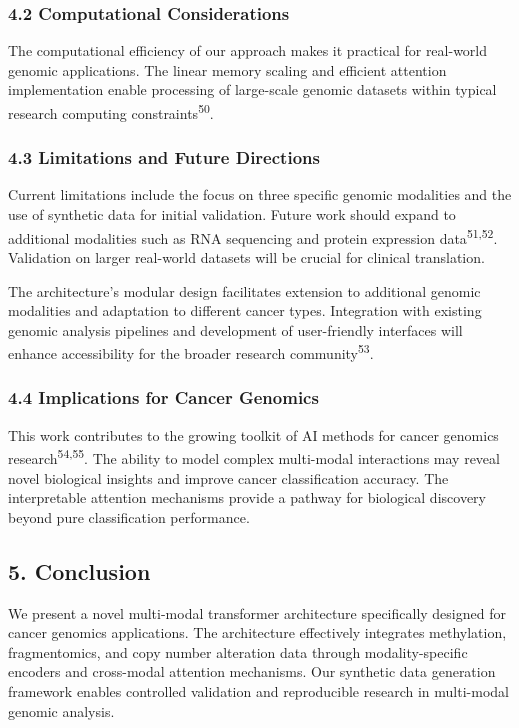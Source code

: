 \subsubsection{4.2 Computational
Considerations}\label{computational-considerations}

The computational efficiency of our approach makes it practical for
real-world genomic applications. The linear memory scaling and efficient
attention implementation enable processing of large-scale genomic
datasets within typical research computing
constraints\textsuperscript{50}.

\subsubsection{4.3 Limitations and Future
Directions}\label{limitations-and-future-directions}

Current limitations include the focus on three specific genomic
modalities and the use of synthetic data for initial validation. Future
work should expand to additional modalities such as RNA sequencing and
protein expression data\textsuperscript{51,52}. Validation on larger
real-world datasets will be crucial for clinical translation.

The architecture's modular design facilitates extension to additional
genomic modalities and adaptation to different cancer types. Integration
with existing genomic analysis pipelines and development of
user-friendly interfaces will enhance accessibility for the broader
research community\textsuperscript{53}.

\subsubsection{4.4 Implications for Cancer
Genomics}\label{implications-for-cancer-genomics}

This work contributes to the growing toolkit of AI methods for cancer
genomics research\textsuperscript{54,55}. The ability to model complex
multi-modal interactions may reveal novel biological insights and
improve cancer classification accuracy. The interpretable attention
mechanisms provide a pathway for biological discovery beyond pure
classification performance.

\subsection{5. Conclusion}\label{conclusion}

We present a novel multi-modal transformer architecture specifically
designed for cancer genomics applications. The architecture effectively
integrates methylation, fragmentomics, and copy number alteration data
through modality-specific encoders and cross-modal attention mechanisms.
Our synthetic data generation framework enables controlled validation
and reproducible research in multi-modal genomic analysis.

